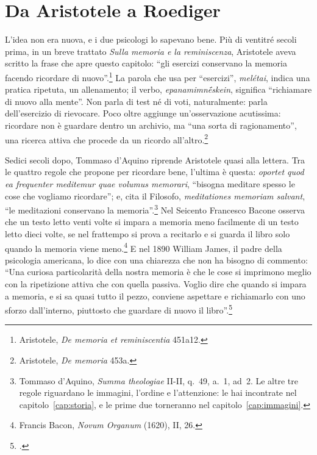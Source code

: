 \section{Da Aristotele a Roediger}

L'idea non era nuova, e i due psicologi lo sapevano bene.
Più di ventitré secoli prima, in un breve trattato \emph{Sulla memoria e
la reminiscenza}, Aristotele aveva scritto la frase che apre questo
capitolo: \enquote{gli esercizi conservano la memoria facendo ricordare
di nuovo}.\footnote{Aristotele, \emph{De memoria et reminiscentia}
451a12.} La parola che usa per \enquote{esercizi}, \emph{melétai}, indica
una pratica ripetuta, un allenamento; il verbo, \emph{epanamimnḗskein},
significa \enquote{richiamare di nuovo alla mente}. Non parla di test
né di voti, naturalmente: parla dell'esercizio di rievocare. Poco oltre
aggiunge un'osservazione acutissima: ricordare non è guardare dentro un
archivio, ma \enquote{una sorta di ragionamento}, una ricerca attiva che
procede da un ricordo all'altro.\footnote{Aristotele, \emph{De memoria}
453a.}

Sedici secoli dopo, Tommaso d'Aquino riprende Aristotele quasi alla
lettera. Tra le quattro regole che propone per ricordare bene, l'ultima
è questa: \emph{oportet quod ea frequenter meditemur quae volumus
memorari}, \enquote{bisogna meditare spesso le cose che vogliamo
ricordare}; e, cita il Filosofo, \emph{meditationes memoriam salvant},
\enquote{le meditazioni conservano la memoria}.\footnote{Tommaso
d'Aquino, \emph{Summa theologiae} II-II, q.~49, a.~1, ad~2. Le altre tre
regole riguardano le immagini, l'ordine e l'attenzione: le hai
incontrate nel capitolo~\ref{cap:storia}, e le prime due torneranno nel
capitolo~\ref{cap:immagini}.} Nel Seicento
Francesco Bacone osserva che un testo letto venti volte si impara a
memoria meno facilmente di un testo letto dieci volte, se nel frattempo
si prova a recitarlo e si guarda il libro solo quando la memoria viene
meno.\footnote{Francis Bacon, \emph{Novum Organum} (1620), II,
26.} E nel 1890 William James, il
padre della psicologia americana, lo dice con una chiarezza che non ha
bisogno di commento: \enquote{Una curiosa particolarità della nostra
memoria è che le cose si imprimono meglio con la ripetizione attiva che
con quella passiva. Voglio dire che quando si impara a memoria, e si sa
quasi tutto il pezzo, conviene aspettare e richiamarlo con uno sforzo
dall'interno, piuttosto che guardare di nuovo il
libro}.\footnote{\textcite[686]{james1890}.}

